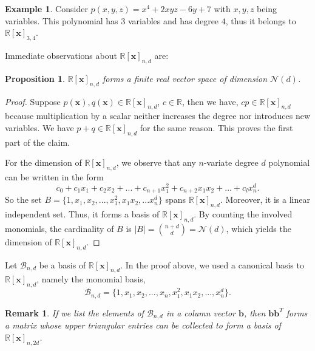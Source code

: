 \documentclass[12pt]{amsart}
\numberwithin{equation}{section}
\newtheorem{prop}[thm]{Proposition}
\newtheorem{remark}[thm]{Remark}
\theoremstyle{definition}
\newtheorem{example}[thm]{Example}
\numberwithin{thm}{section}
\begin{document}
\begin{example}
     Consider $p(x, y, z) = x^4 + 2xyz - 6y + 7$ with $x, y, z$ being variables. 
     This polynomial has $3$ variables and has degree $4$, thus it 
     belongs to $\mathbb{R}[\mathbf{x}]_{3, 4}$.
\end{example}

Immediate observations about $\mathbb{R}[\mathbf{x}]_{n, d}$ are:
\begin{prop}
     \label{prop:vs}
     $\mathbb{R}[\mathbf{x}]_{n, d}$ forms a finite real vector space of dimension $\mathcal{N}(d)$.
\end{prop}
    
\begin{proof}
     Suppose $p(\mathbf{x}), q(\mathbf{x}) \in \mathbb{R}[\mathbf{x}]_{n, d}$, $c \in \mathbb{R}$, then we have,
     $cp \in \mathbb{R}[\mathbf{x}]_{n, d}$ because multiplication by a scalar neither increases the degree nor introduces new variables.
     We have $p + q \in \mathbb{R}[\mathbf{x}]_{n, d}$ for the same reason. This proves the first part of the claim. 

     For the dimension of $\mathbb{R}[\mathbf{x}]_{n, d}$, we observe that
     any $n$-variate degree $d$ polynomial can be written in the form 
     \begin{equation*}c_0 + c_1 x_1 + c_2 x_2 + ... + c_{n+1} x_1^2 + c_{n+2} x_1 x_2 + ... + c_l x_n^d.
     \end{equation*}
     So the set $B = \{1, x_1, x_2, ..., x_1^2, x_1 x_2, ... x_n^d\}$ spans $\mathbb{R}[\mathbf{x}]_{n, d}$.
     Moreover, it is a linear independent set. Thus, it forms a basis of $\mathbb{R}[\mathbf{x}]_{n, d}$.
     By counting the involved monomials, the cardinality of $B$ is $|B| = {n+d \choose d} = \mathcal{N}(d)$, 
     which yields the dimension of $\mathbb{R}[\mathbf{x}]_{n, d}$.

\end{proof}

Let $\mathcal{B}_{n, d}$ be a basis of $\mathbb{R}[\mathbf{x}]_{n, d}$. 
In the proof above, we used a canonical basis to $\mathbb{R}[\mathbf{x}]_{n, d}$, 
namely the monomial basis,
\begin{equation*}
     \mathcal{B}_{n, d} = \{1, x_1, x_2, ..., x_n, x_1 ^ 2, x_1 x_2, ..., x_n^d\}.
\end{equation*}

\begin{remark}
     \label{rem:upgrade}
     If we list the elements of $\mathcal{B}_{n, d}$ in a column vector $\mathbf{b}$, 
     then $\mathbf{b} \mathbf{b}^T$ forms a matrix whose upper triangular
     entries can be collected to form a basis of $\mathbb{R}[\mathbf{x}]_{n, 2d}$.
\end{remark}
\end{document}

